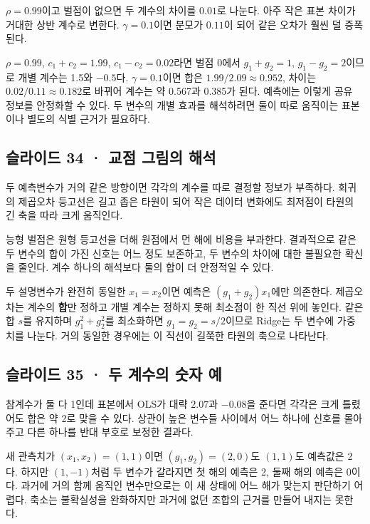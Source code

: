 \documentclass[11pt,a4paper]{article}
\begin{document}
$\rho=0.99$이고 벌점이 없으면 두 계수의 차이를 $0.01$로 나눈다. 아주 작은 표본 차이가 거대한 상반 계수로 변한다. $\gamma=0.1$이면 분모가 $0.11$이 되어 같은 오차가 훨씬 덜 증폭된다.\par

$\rho=0.99$, $c_1+c_2=1.99$, $c_1-c_2=0.02$라면 벌점 0에서 $g_1+g_2=1$, $g_1-g_2=2$이므로 개별 계수는 1.5와 $-0.5$다. $\gamma=0.1$이면 합은 $1.99/2.09\approx0.952$, 차이는 $0.02/0.11\approx0.182$로 바뀌어 계수는 약 0.567과 0.385가 된다. 예측에는 이렇게 공유 정보를 안정화할 수 있다. 두 변수의 개별 효과를 해석하려면 둘이 따로 움직이는 표본이나 별도의 식별 근거가 필요하다.\par

\subsection{슬라이드 34 · 교점 그림의 해석}
두 예측변수가 거의 같은 방향이면 각각의 계수를 따로 결정할 정보가 부족하다. 회귀의 제곱오차 등고선은 길고 좁은 타원이 되어 작은 데이터 변화에도 최저점이 타원의 긴 축을 따라 크게 움직인다.\par

능형 벌점은 원형 등고선을 더해 원점에서 먼 해에 비용을 부과한다. 결과적으로 같은 두 변수의 합이 가진 신호는 어느 정도 보존하고, 두 변수의 차이에 대한 불필요한 확신을 줄인다. 계수 하나의 해석보다 둘의 합이 더 안정적일 수 있다.\par

두 설명변수가 완전히 동일한 $x_1=x_2$이면 예측은 $(g_1+g_2)x_1$에만 의존한다. 제곱오차는 계수의 \textbf{합}만 정하고 개별 계수는 정하지 못해 최소점이 한 직선 위에 놓인다. 같은 합 $s$를 유지하며 $g_1^2+g_2^2$를 최소화하면 $g_1=g_2=s/2$이므로 Ridge는 두 변수에 가중치를 나눈다. 거의 동일한 경우에는 이 직선이 길쭉한 타원의 축으로 나타난다.\par

\subsection{슬라이드 35 · 두 계수의 숫자 예}
참계수가 둘 다 1인데 표본에서 OLS가 대략 $2.07$과 $-0.08$을 준다면 각각은 크게 틀렸어도 합은 약 2로 맞을 수 있다. 상관이 높은 변수들 사이에서 어느 하나에 신호를 몰아주고 다른 하나를 반대 부호로 보정한 결과다.\par

새 관측치가 $(x_1,x_2)=(1,1)$이면 $(g_1,g_2)=(2,0)$도 $(1,1)$도 예측값은 2다. 하지만 $(1,-1)$처럼 두 변수가 갈라지면 첫 해의 예측은 2, 둘째 해의 예측은 0이다. 과거에 거의 함께 움직인 변수만으로는 이 새 상태에 어느 해가 맞는지 판단하기 어렵다. 축소는 불확실성을 완화하지만 과거에 없던 조합의 근거를 만들어 내지는 못한다.\par
\end{document}
